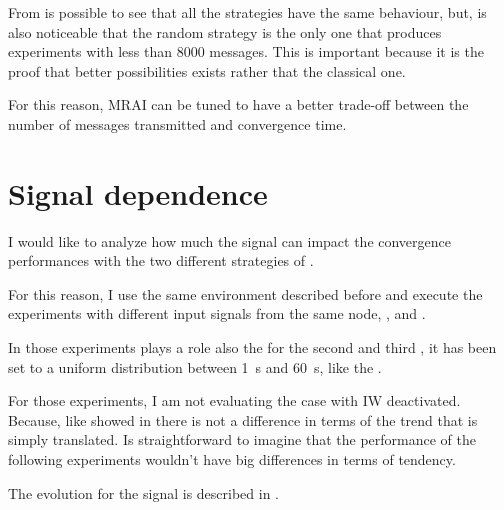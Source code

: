 From  is possible to see that all the strategies have the same
behaviour, but, is also noticeable that the random strategy is the only
one that produces experiments with less than \num{8000} messages.
This is important because it is the proof that better possibilities exists rather
that the classical one.

For this reason, \ac{MRAI} can be tuned to have a better trade-off between
the number of messages transmitted and convergence time.

\section{Signal dependence}
\label{sec:bgp_mrai_signal_dependance}

I would like to analyze how much the signal can impact the convergence performances
with the two different strategies of .

For this reason, I use the same environment described before and execute the
experiments with different input signals from the same node, , 
and .

In those experiments plays a role also the 
for the second and third , it has been set to a uniform distribution
between \SI{1}{\second} and \SI{60}{\second}, like the .

For those experiments, I am not evaluating the case with \ac{IW} deactivated.
Because, like showed in
there is not a difference in terms of the trend that is simply translated.
Is straightforward to imagine that the performance of the following experiments
wouldn't have big differences in terms of tendency.

The evolution for the signal  is described in .

